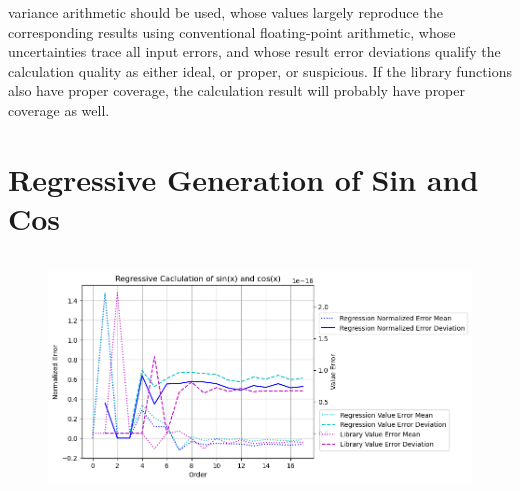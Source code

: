 \documentclass[twoside]{article}
\numberwithin{equation}{section}
\begin{document}
variance arithmetic should be used, whose values largely reproduce the corresponding results using conventional floating-point arithmetic, whose uncertainties trace all input errors, and whose result error deviations qualify the calculation quality as either ideal, or proper, or suspicious.
If the library functions also have proper coverage, the calculation result will probably have proper coverage as well.







\clearpage
\section{Regressive Generation of Sin and Cos}
\label{sec: recursion}

\begin{figure}
\centering
\includegraphics[height=2.5in]{Uncertain_Sin.png}
\label{fig: Uncertain_Sin}
\end{figure}
\end{document}
